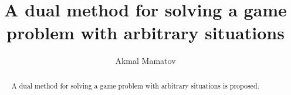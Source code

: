 \begin{englishtitle} %
\title{A dual method for solving a game problem with arbitrary situations}
\author{Akmal Mamatov
}

\maketitle

\begin{abstract}
A dual method for solving a game problem with arbitrary situations is proposed.
\end{abstract}
\end{englishtitle}

\iffalse
%
%





\documentclass[12pt]{llncs}

\usepackage{iftex}

\ifPDFTeX
\usepackage[T2A]{fontenc}
\usepackage[utf8]{inputenc} %
\usepackage[english,russian]{babel}
\fi



